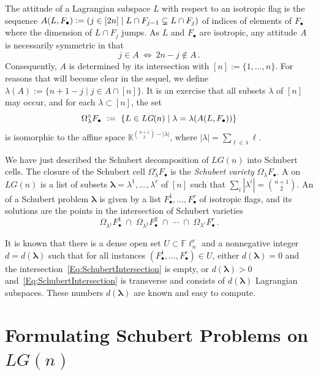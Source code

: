 \documentclass[12pt]{amsart}
\theoremstyle{remark}
\newcommand{\Fdot}{F_\bullet}
\newcommand{\LG}{\textit{LG}}
\newcommand{\Fln}{{\mathbb F}\ell_n}
\newcommand{\blambda}{\boldsymbol{\lambda}}
\newcommand{\KK}{{\mathbb K}}
\newcommand{\defcolor}[1]{{\color{blue}#1}}
\newcommand{\demph}[1]{\defcolor{{\sl #1}}}
\begin{document}
The attitude of a Lagrangian subspace $L$ with respect to an isotropic flag is the sequence
$A(L,\Fdot)\vcentcolon=(j\in[2n]\mid L\cap F_{j-1}\subsetneq L\cap F_j)$ of indices of elements of $\Fdot$ where the dimension of
$L\cap F_j$ jumps.
As $L$ and $\Fdot$ are isotropic, any attitude $A$ is necessarily symmetric in that
%
\[
    j\in A \ \Longleftrightarrow\  2n-j\not\in A\,.
\]
%
Consequently, $A$ is determined by its intersection with $[n]:=\{1,\dotsc,n\}$.
For reasons that will become clear in the sequel, we define $\lambda(A):=\{ n+1-j\mid j\in A\cap[n]\}$.
It is an exercise that all subsets $\lambda$ of $[n]$ may occur, and for each $\lambda\subset[n]$, the set
\[
   \Omega_\lambda^\circ \Fdot\ \vcentcolon=\ 
\{ L\in\LG(n) \mid \lambda = \lambda(A(L,\Fdot))\}
\]
is isomorphic to the affine space $\KK^{\binom{n+1}{2}-|\lambda|}$, where $|\lambda|=\sum_{\ell\in\lambda}\ell$.

We have just described the Schubert decomposition of $LG(n)$ into Schubert cells.
The closure of the Schubert cell $\Omega_\lambda^\circ \Fdot$ is the \emph{Schubert variety} \defcolor{$\Omega_\lambda\Fdot$}.
A \demph{Schubert problem} on $\LG(n)$ is a list of subsets
$\blambda = \lambda^1,\dotsc,\lambda^r$ of $[n]$ such that $\sum_i|\lambda^i|=\binom{n+1}{2}$.
An \demph{instance} of a Schubert problem $\blambda$ is given by a list $\Fdot^1,\dotsc,\Fdot^r$ of isotropic flags, and
its solutions are the points in the intersection of Schubert varieties
%
 \begin{equation}\label{Eq:SchubertIntersection}
   \Omega_{\lambda^1}\Fdot^1\; \cap\;
   \Omega_{\lambda^2}\Fdot^2\; \cap\; \dotsb
   \; \cap\; \Omega_{\lambda^r}\Fdot^r\,.
 \end{equation}
%   

It is known that there is a dense open set $U\subset\Fln^r$ and a nonnegative integer $d=d(\blambda)$ such that for all
instances $(\Fdot^1,\dotsc,\Fdot^r)\in U$, either $d(\blambda)=0$ and the intersection~\eqref{Eq:SchubertIntersection}
is empty, or $d(\blambda)>0$ and~\eqref{Eq:SchubertIntersection} is transverse and consists of $d(\blambda)$ Lagrangian subspaces.
These numbers $d(\blambda)$ are known and easy to compute.
 
\section{Formulating Schubert Problems on $LG(n)$}
\end{document}
